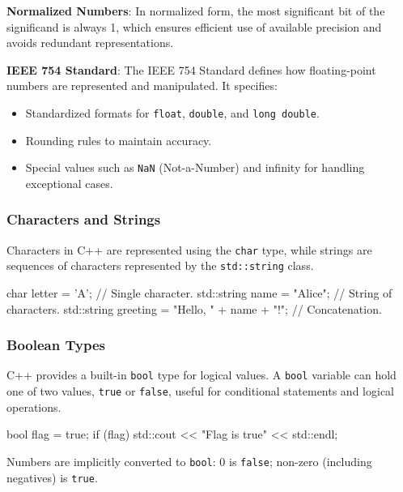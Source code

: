 \textbf{Normalized Numbers}: In normalized form, the most significant bit of the significand is always 1, which ensures efficient use of available precision and avoids redundant representations.

\textbf{IEEE 754 Standard}: The IEEE 754 Standard defines how floating-point numbers are represented and manipulated. It specifies:

\begin{itemize}
    \item Standardized formats for \texttt{float}, \texttt{double}, and \texttt{long double}.
    \item Rounding rules to maintain accuracy.
    \item Special values such as \texttt{NaN} (Not-a-Number) and infinity for handling exceptional cases.
\end{itemize}


\subsubsection{Characters and Strings}

Characters in C++ are represented using the \texttt{char} type, while strings are sequences of characters represented by the \texttt{std::string} class.

\vspace{-0.5em}

\begin{codeblock}[language=C++, numbers=none]
char letter = 'A'; // Single character.
std::string name = "Alice"; // String of characters.
std::string greeting = "Hello, " + name + "!"; // Concatenation.
\end{codeblock}

\subsubsection{Boolean Types}

C++ provides a built-in \texttt{bool} type for logical values. A \texttt{bool} variable can hold one of two values, \texttt{true} or \texttt{false}, useful for conditional statements and logical operations. 

\vspace{-0.5em}

\begin{codeblock}[language=C++, numbers=none]
bool flag = true;
if (flag) {
    std::cout << "Flag is true" << std::endl;
}
\end{codeblock}
Numbers are implicitly converted to \texttt{bool}: 0 is \texttt{false}; non-zero (including negatives) is \texttt{true}.

